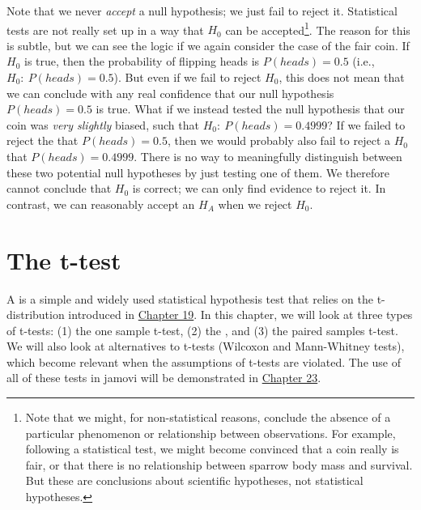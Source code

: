 \documentclass[
  openany]{krantz}
\begin{document}
Note that we never \emph{accept} a null hypothesis; we just fail to reject it.
Statistical tests are not really set up in a way that \(H_{0}\) can be accepted\footnote{Note that we might, for non-statistical reasons, conclude the absence of a particular phenomenon or relationship between observations. For example, following a statistical test, we might become convinced that a coin really is fair, or that there is no relationship between sparrow body mass and survival. But these are conclusions about scientific hypotheses, not statistical hypotheses.}.
The reason for this is subtle, but we can see the logic if we again consider the case of the fair coin.
If \(H_{0}\) is true, then the probability of flipping heads is \(P(heads) = 0.5\) (i.e., \(H_{0}:\:P(heads) = 0.5\)).
But even if we fail to reject \(H_{0}\), this does not mean that we can conclude with any real confidence that our null hypothesis \(P(heads) = 0.5\) is true.
What if we instead tested the null hypothesis that our coin was \emph{very slightly} biased, such that \(H_{0}:\:P(heads) = 0.4999\)?
If we failed to reject the  that \(P(heads) = 0.5\), then we would probably also fail to reject a \(H_{0}\) that \(P(heads) = 0.4999\).
There is no way to meaningfully distinguish between these two potential null hypotheses by just testing one of them.
We therefore cannot conclude that \(H_{0}\) is correct; we can only find evidence to reject it.
In contrast, we can reasonably accept an  \(H_{A}\) when we reject \(H_{0}\).

\hypertarget{Chapter_22}{%
\chapter{The t-test}\label{Chapter_22}}

A  is a simple and widely used statistical hypothesis test that relies on the t-distribution introduced in \protect\hyperlink{Chapter_19}{Chapter 19}.
In this chapter, we will look at three types of t-tests: (1) the one sample t-test, (2) the , and (3) the paired samples t-test.
We will also look at  alternatives to t-tests (Wilcoxon and Mann-Whitney tests), which become relevant when the assumptions of t-tests are violated.
The use of all of these tests in jamovi will be demonstrated in \protect\hyperlink{Chapter_23}{Chapter 23}.
\end{document}
